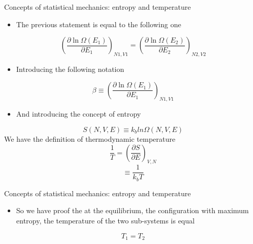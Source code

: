 \documentclass{beamer}
\begin{document}
\begin{frame}{Concepts of statistical mechanics: entropy and temperature \cite{frenkel2001understanding}}
\begin{itemize}
\item The previous statement is equal to the following one
\end{itemize}
\begin{equation*}
\left( \frac{\partial \ln \Omega(E_{1})}{\partial E_{1}} \right)_{N1,V1}=\left( \frac{\partial \ln \Omega(E_{2})}{\partial E_{2}} \right)_{N2,V2}
\end{equation*}
\begin{itemize}
\item Introducing the following notation
\end{itemize}
\begin{equation*}
\beta\equiv\left( \frac{\partial \ln \Omega(E_{1})}{\partial E_{1}} \right)_{N1,V1}
\end{equation*}
\begin{itemize}
\item And introducing the concept of entropy 
\end{itemize}
\begin{equation*}
S(N,V,E)\equiv k_{b}ln\Omega(N,V,E)
\end{equation*}
We have the definition of thermodynamic temperature 
\begin{equation*}
\frac{1}{T}=\left( \dfrac{\partial S}{\partial E} \right)_{V,N}
\end{equation*}
\begin{equation*}
\equiv\dfrac{1}{k_{b}T}
\end{equation*}
\end{frame}

\begin{frame}{Concepts of statistical mechanics: entropy and temperature \cite{frenkel2001understanding}}
\begin{itemize}
\item So we have proof the at the equilibrium, the configuration with maximum entropy, the temperature of the two sub-systems is equal 
\end{itemize}
\begin{equation*}
T_{1}=T_{2}
\end{equation*}
\end{frame}
\end{document}
